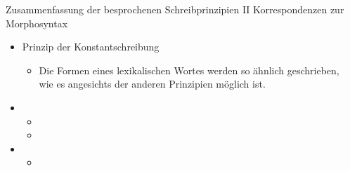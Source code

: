 \begin{frame}
  {Zusammenfassung der besprochenen Schreibprinzipien II}
  Korrespondenzen zur Morphosyntax\\
  \Zeile
  \pause
  \begin{itemize}[<+->]
    \item \alert{Prinzip der Konstantschreibung}
      \begin{itemize}[<+->]
        \item Die Formen eines lexikalischen Wortes werden so ähnlich geschrieben,\\
          wie es angesichts der anderen Prinzipien möglich ist.
      \end{itemize}
      \Zeile
    \item {}
      \begin{itemize}[<+->]
        \item {}
        \item {}
      \end{itemize}
      \Zeile
    \item {}
      \begin{itemize}[<+->]
        \item {}
      \end{itemize}
  \end{itemize}
\end{frame}

